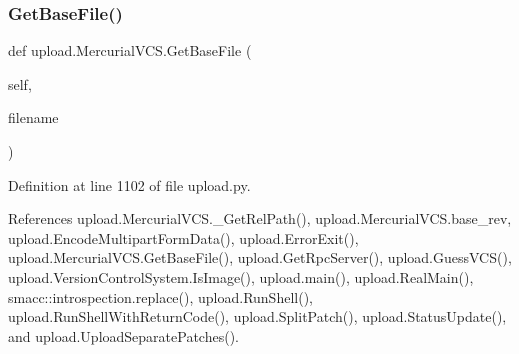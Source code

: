 \subsubsection{\texorpdfstring{Get\+Base\+File()}{GetBaseFile()}\hspace{0.1cm}{\footnotesize\ttfamily [1/2]}}
{\footnotesize\ttfamily def upload.\+Mercurial\+V\+C\+S.\+Get\+Base\+File (\begin{DoxyParamCaption}\item[{}]{self,  }\item[{}]{filename }\end{DoxyParamCaption})}



Definition at line 1102 of file upload.\+py.



References upload.\+Mercurial\+V\+C\+S.\+\_\+\+Get\+Rel\+Path(), upload.\+Mercurial\+V\+C\+S.\+base\+\_\+rev, upload.\+Encode\+Multipart\+Form\+Data(), upload.\+Error\+Exit(), upload.\+Mercurial\+V\+C\+S.\+Get\+Base\+File(), upload.\+Get\+Rpc\+Server(), upload.\+Guess\+V\+C\+S(), upload.\+Version\+Control\+System.\+Is\+Image(), upload.\+main(), upload.\+Real\+Main(), smacc\+::introspection.\+replace(), upload.\+Run\+Shell(), upload.\+Run\+Shell\+With\+Return\+Code(), upload.\+Split\+Patch(), upload.\+Status\+Update(), and upload.\+Upload\+Separate\+Patches().



